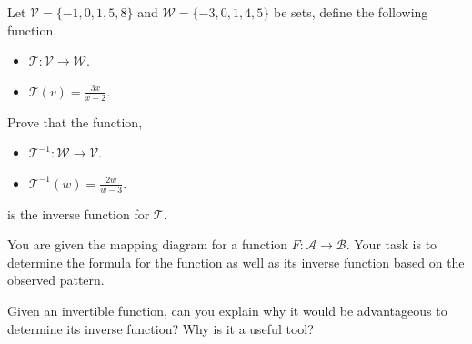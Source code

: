 \documentclass[12pt]{article} %
\begin{document}
\begin{qstn}
  Let $ \mathcal{V} = \{-1,0,1,5,8\} $ and $ \mathcal{W} = \{-3,0,1,4,5\} $ be sets, define the following function, 
  \begin{itemize}
    \item $\mathcal{T} \colon \mathcal{V} \to \mathcal{W}$.
    \item $\mathcal{T}(v) = \frac{3x}{x - 2}$.
  \end{itemize}
  Prove that the function,
  \begin{itemize}
    \item $\mathcal{T}^{-1} \colon \mathcal{W} \to \mathcal{V}$.
    \item $\mathcal{T}^{-1}(w) = \frac{2w}{w-3}$.
  \end{itemize}
  is the inverse function for $\mathcal{T}$. 
\end{qstn}

\begin{qstn}
  You are given the mapping diagram for a function $F \colon \mathcal{A} \to \mathcal{B}$. Your task is to determine the formula for the function as well as its
  inverse function based on the observed pattern.
    \begin{center}
  \end{center}
\end{qstn}

\begin{qstn}
  Given an invertible function, can you explain why it would be advantageous to determine its inverse function?
  Why is it a useful tool? 
\end{qstn}
\end{document}
